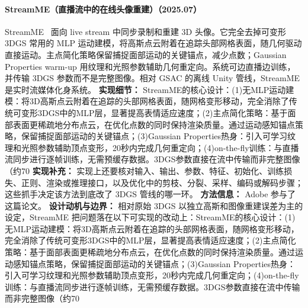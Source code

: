 \paragraph{StreamME（直播流中的在线头像重建）（2025.07）}
StreamME~\cite{2507_17029} 面向 live stream 中同步录制和重建 3D 头像。它完全去掉可变形 3DGS 常用的 MLP 运动建模，将高斯点云附着在追踪头部网格表面，随几何驱动直接运动。主点简化策略保留捕捉面部运动的关键锚点，减少点数；Gaussian Properties warm-up 用纹理和光照参数辅助几何重定向。系统可边直播边训练，并传输 3DGS 参数而不是完整图像。相对 GSAC 的离线 Unity 管线，StreamME 是实时流媒体化身系统。
\textbf{实现细节：} StreamME的核心设计：(1)无MLP运动建模：将3D高斯点云附着在追踪的头部网格表面，随网格变形移动，完全消除了传统可变形3DGS中的MLP层，显著提高表情适应速度；(2)主点简化策略：基于面部表面更稀疏地分布点云，在优化点数的同时保持渲染质量。通过运动感知锚点策略，保留捕捉面部运动的关键锚点；(3)Gaussian Properties热身：引入可学习纹理和光照参数辅助顶点变形，20秒内完成几何重定向；(4)on-the-fly训练：与直播流同步进行逐帧训练，无需预缓存数据。3DGS参数直接在流中传输而非完整图像（约70
\textbf{实现补充：} 实现上还要核对输入、输出、参数、特征、初始化、训练损失、正则、渲染或推理接口，以及优化中的剪枝、分裂、采样、编码或解码步骤；这些抓手决定该方法到底改了 3DGS 管线的哪一环。
\textbf{方法信息：} Adobe 参与了这篇论文。
\textbf{设计动机与边界：} 相对原始 3DGS 以独立高斯和图像重建误差为主的设定，StreamME 把问题落在以下可实现的改动上：StreamME的核心设计：(1)无MLP运动建模：将3D高斯点云附着在追踪的头部网格表面，随网格变形移动，完全消除了传统可变形3DGS中的MLP层，显著提高表情适应速度；(2)主点简化策略：基于面部表面更稀疏地分布点云，在优化点数的同时保持渲染质量。通过运动感知锚点策略，保留捕捉面部运动的关键锚点；(3)Gaussian Properties热身：引入可学习纹理和光照参数辅助顶点变形，20秒内完成几何重定向；(4)on-the-fly训练：与直播流同步进行逐帧训练，无需预缓存数据。3DGS参数直接在流中传输而非完整图像（约70%
